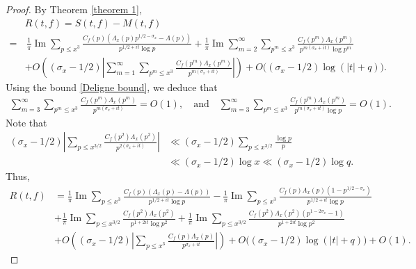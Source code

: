 \documentclass[11pt,reqno]{amsart}
\numberwithin{equation}{section}
\theoremstyle{plain}
\theoremstyle{definition}
\renewcommand{\Im}{\operatorname{Im}}
\begin{document}
\begin{proof}
By Theorem \ref{theorem 1},
\begin{equation*}
\begin{split}
&R(t,f)=S(t,f)-M(t,f)\\=&\,\frac{1}{\pi}\Im\sum_{p\leq x^3}
\frac{C_f(p)(\Lambda_x(p)p^{1/2-\sigma_x}-\Lambda(p))}{p^{1/2+it}\log p}
+\frac{1}{\pi}\Im\sum_{m=2}^\infty\sum_{p^m\leq x^3}\frac{C_f(p^m)\Lambda_x(p^m)}{p^{m(\sigma_x+it)}\log p^m}\\
&+O\left((\sigma_x-1/2)\left|\sum_{m=1}^\infty\sum_{p^m\leq x^3} \frac{C_f(p^m)
\Lambda_x(p^m)}{p^{m(\sigma_x+it)}}\right|\right)
+O\big((\sigma_x-1/2)\log(|t|+q)\big).
\end{split}
\end{equation*}
Using the bound \eqref{Deligne bound}, we deduce that
\begin{equation*}
\begin{split}
\sum_{m=3}^\infty\sum_{p^m\leq x^3}\frac{C_f(p^m)\Lambda_x(p^m)}{p^{m(\sigma_x+it)}}=O(1),\quad\text{and}\quad
\sum_{m=3}^\infty\sum_{p^m\leq x^3}\frac{C_f(p^m)\Lambda_x(p^m)}{p^{m(\sigma_x+it)}\log p}=O(1).
\end{split}
\end{equation*}
Note that
\begin{equation*}
\begin{split}
(\sigma_x-1/2)\left|\sum_{p\leq x^{3/2}} \frac{C_f(p^2)
\Lambda_x(p^2)}{p^{2(\sigma_x+it)}}\right| &\ll
(\sigma_x-1/2)\sum_{p\leq x^{3/2}}\frac{\log p}{p}\\
&\ll(\sigma_x-1/2)\log x\ll (\sigma_x-1/2)\log q.
\end{split}
\end{equation*}
Thus,
\begin{equation*}
\begin{split}
R(t,f)&=\frac{1}{\pi}\Im\sum_{p\leq x^3}
\frac{C_f(p)(\Lambda_x(p)-\Lambda(p))}{p^{1/2+it}\log p}
-\frac{1}{\pi}\Im\sum_{p\leq x^3}
\frac{C_f(p)\Lambda_x(p)(1-p^{1/2-\sigma_x})}{p^{1/2+it}\log p}\\
&+\frac{1}{\pi}\Im\sum_{p\leq x^{3/2}}\frac{C_f(p^2)\Lambda_x(p^2)}{p^{1+2it}\log p^2}
+\frac{1}{\pi}\Im\sum_{p\leq x^{3/2}}\frac{C_f(p^2)\Lambda_x(p^2)(p^{1-2\sigma_x}-1)}{p^{1+2it}\log p^2}\\
&+O\left((\sigma_x-1/2)\left|\sum_{p\leq x^3} \frac{C_f(p)
\Lambda_x(p)}{p^{\sigma_x+it}}\right|\right)
+O\big((\sigma_x-1/2)\log(|t|+q)\big)+O(1).
\end{split}
\end{equation*}

\end{proof}
\end{document}
